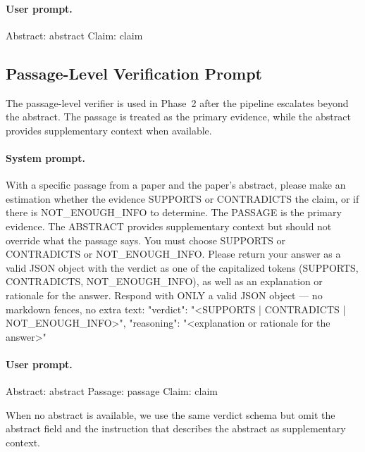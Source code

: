 \documentclass{article}
\theoremstyle{plain}
\theoremstyle{definition}
\theoremstyle{remark}
\begin{document}
\paragraph{User prompt.}
\begin{promptbox}
Abstract: {abstract}
Claim: {claim}
\end{promptbox}

\subsection{Passage-Level Verification Prompt}
\label{app:passage_prompt}

The passage-level verifier is used in Phase~2 after the pipeline escalates beyond the abstract. The passage is treated as the primary evidence, while the abstract provides supplementary context when available.

\paragraph{System prompt.}
\begin{promptbox}
With a specific passage from a paper and the paper's abstract, please make an estimation whether the evidence SUPPORTS or CONTRADICTS the claim, or if there is NOT_ENOUGH_INFO to determine.
The PASSAGE is the primary evidence. The ABSTRACT provides supplementary context but should not override what the passage says.
You must choose SUPPORTS or CONTRADICTS or NOT_ENOUGH_INFO.
Please return your answer as a valid JSON object with the verdict as one of the capitalized tokens (SUPPORTS, CONTRADICTS, NOT_ENOUGH_INFO), as well as an explanation or rationale for the answer.
Respond with ONLY a valid JSON object — no markdown fences, no extra text:
{
  "verdict": "<SUPPORTS | CONTRADICTS | NOT_ENOUGH_INFO>",
  "reasoning": "<explanation or rationale for the answer>"
}
\end{promptbox}

\paragraph{User prompt.}
\begin{promptbox}
Abstract: {abstract}
Passage: {passage}
Claim: {claim}
\end{promptbox}

When no abstract is available, we use the same verdict schema but omit the abstract field and the instruction that describes the abstract as supplementary context.
\end{document}
